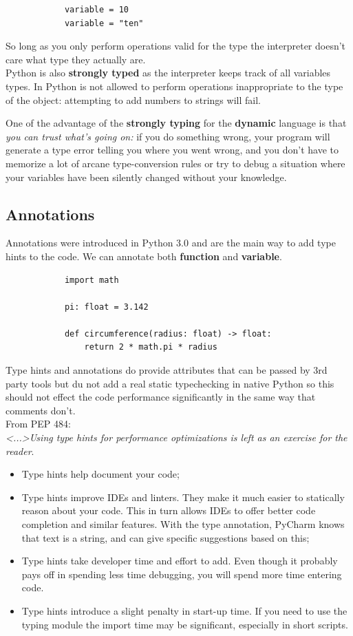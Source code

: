 \documentclass[12pt]{article}
\begin{document}
		\begin{lstlisting}
			variable = 10
			variable = "ten"
		\end{lstlisting}
		
		So long as you only perform operations valid for the type the interpreter doesn't care what type they actually are. \\
		
		Python is also \textbf{strongly typed} as the interpreter keeps track of all variables types. In Python is not allowed to perform operations inappropriate to the type of the object: attempting to add numbers to strings will fail.
		
		One of the advantage of the \textbf{strongly typing} for the \textbf{dynamic} language is that \textit{you can trust what's going on:} if you do something wrong, your program will generate a type error telling you where you went wrong, and you don't have to memorize a lot of arcane type-conversion rules or try to debug a situation where your variables have been silently changed without your knowledge.
		
	\subsection{Annotations}
		Annotations were introduced in Python 3.0 and are the main way to add type hints to the code. We can annotate both \textbf{function} and \textbf{variable}.
		
		\begin{lstlisting}
			import math
			
			pi: float = 3.142
			
			def circumference(radius: float) -> float:
				return 2 * math.pi * radius
		\end{lstlisting}
		
		Type hints and annotations do provide attributes that can be passed by 3rd party tools but du not add a real static typechecking in native Python so this should not effect the code performance significantly in the same way that comments don't.\\
		From PEP 484:\\
		\textit{ <...>Using type hints for performance optimizations is left as an exercise for the reader}.
		
		\begin{itemize}
			\item Type hints help document your code;
			\item Type hints improve IDEs and linters. They make it much easier to statically reason about your code. This in turn allows IDEs to offer better code completion and similar features. With the type annotation, PyCharm knows that text is a string, and can give specific suggestions based on this;
			\item Type hints take developer time and effort to add. Even though it probably pays off in spending less time debugging, you will spend more time entering code.
			\item Type hints introduce a slight penalty in start-up time. If you need to use the typing module the import time may be significant, especially in short scripts.	
		\end{itemize}
		
\end{document}
